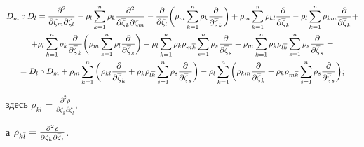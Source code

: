 \begin{multline*}


D_m\circ D_l


=\frac{\partial^2}{\partial\zeta_m\partial\zeta_l}


-\rho_l\sum_{k=1}^n\rho_k\frac{\partial^2}{\partial\ovl\zeta_k\partial\zeta_m}


-\frac{\partial}{\partial\zeta_l}\bigg(\rho_m\sum_{k=1}^n\rho_k\frac{\partial}


{\partial\ovl\zeta_k}\bigg)+




\rho_m\sum_{k=1}^n\rho_{kl}\frac{\partial}{\partial\ovl\zeta_k}


-\rho_l\sum_{k=1}^n\rho_{km}\frac{\partial}{\partial\ovl\zeta_k}+ \\




+\rho_l\sum_{k=1}^n\rho_{k}\frac{\partial}{\partial\ovl\zeta_k}


\bigg(\rho_m\sum_{s=1}^n\rho_l\frac{\partial}{\partial\ovl\zeta_s}\bigg)-




\rho_l\sum_{k=1}^n\rho_k\rho_{m\ovl k}\sum_{s=1}^n\rho_s\frac{\partial}


{\partial\ovl\zeta_s}+\rho_m\sum_{k=1}^n\rho_k\rho_{l\ovl k}


\sum_{s=1}^n\rho_s\frac\partial{\partial\ovl\zeta_s}=\\


=D_l\circ D_m+\rho_m\sum_{k=1}^n\bigg(\rho_{kl}


\frac{\partial}{\partial\ovl\zeta_k}


+\rho_k\rho_{l\ovl k}\sum_{s=1}^n\rho_s\frac{\partial}{\partial\ovl\zeta_s}


\bigg)-


\rho_l\sum_{k=1}^n\bigg(\rho_{km}\frac{\partial}{\partial\ovl\zeta_k}


+\rho_k\rho_{m\ovl k}\sum_{s=1}^n\rho_s\frac{\partial}{\partial\ovl\zeta_s}


\bigg);


\end{multline*}


здесь $\rho_{kl}=\frac{\partial^2\rho}{\partial\zeta_k\partial\zeta_l}$,


а $\rho_{k\overline l}=\frac{\partial^2\rho}{\partial\zeta_k\partial\overline\zeta_l}$.





